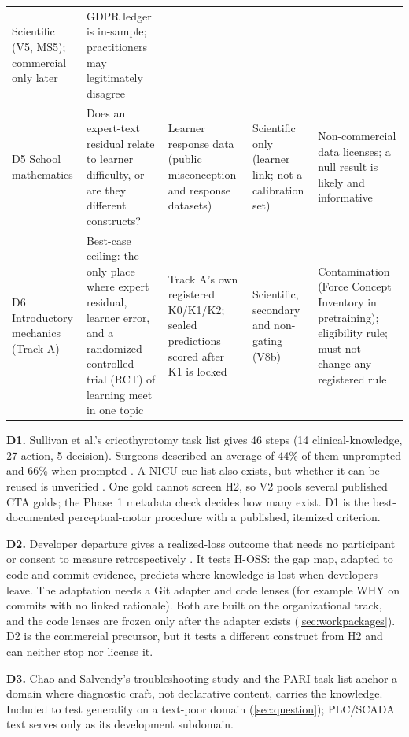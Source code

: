 \begin{table}[tbp]
\begin{tabularx}{\linewidth}{@{}p{1.7cm}XXp{2.0cm}X@{}}
      Scientific (V5, MS5); commercial only later &
      GDPR ledger is in-sample; practitioners may legitimately disagree \\
    D5 School mathematics &
      Does an expert-text residual relate to learner difficulty, or are they different constructs? &
      Learner response data (public misconception and response datasets) &
      Scientific only (learner link; not a calibration set) &
      Non-commercial data licenses; a null result is likely and informative \\
    D6 Introductory mechanics (Track A) &
      Best-case ceiling: the only place where expert residual, learner error, and a randomized controlled trial (RCT) of learning meet in one topic &
      Track A's own registered K0/K1/K2; sealed predictions scored after K1 is locked &
      Scientific, secondary and non-gating (V8b) &
      Contamination (Force Concept Inventory in pretraining); eligibility rule; must not change any registered rule \\
    \bottomrule
  \end{tabularx}
\end{table}

\textbf{D1.} Sullivan et al.'s cricothyrotomy task list gives 46 steps (14 clinical-knowledge, 27
action, 5 decision). Surgeons described an average of 44\% of them unprompted and 66\% when
prompted \evlit{} \parencite{sullivan2014use}. A NICU cue list also exists, but whether it can be
reused is unverified \evlit{} \parencite{crandall1993critical}. One gold cannot screen H2, so V2
pools several published CTA golds; the Phase~1 metadata check decides how many exist. D1 is the
best-documented perceptual-motor procedure with a published, itemized criterion.

\textbf{D2.} Developer departure gives a realized-loss outcome that needs no participant or consent
to measure retrospectively \evlit{} \parencite{avelino2016novel,avelino2019abandonment,rigby2016quantifying,nassif2017revisiting}.
It tests H-OSS: the gap map, adapted to code and commit evidence, predicts where knowledge is lost
when developers leave. The adaptation needs a Git adapter and code lenses (for example WHY on
commits with no linked rationale). Both are built on the organizational track, and the code lenses
are frozen only after the adapter exists (\cref{sec:workpackages}). D2 is the commercial
precursor, but it tests a different construct from H2 and can neither stop nor license it.

\textbf{D3.} Chao and Salvendy's troubleshooting study \evlit{} \parencite{chao1994percentage} and
the PARI task list \evlit{} \parencite{hall1995procedural} anchor a domain where diagnostic craft,
not declarative content, carries the knowledge. Included to test generality on a text-poor domain
(\cref{sec:question}); PLC/SCADA text serves only as its development subdomain.

